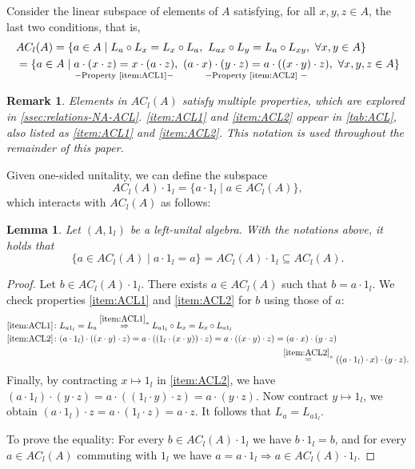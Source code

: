 \documentclass[12pt]{article}
\newtheorem{lemma}[theorem]{Lemma}
\newtheorem{remark}[theorem]{Remark}
\begin{document}
		Consider the linear subspace of elements of $A$ satisfying, for all $x,y,z\in A$, the last two conditions, that is,
		\begin{align*}
			&AC_l(A)=\{a\in A \mid L_a\circ L_x=L_x\circ L_a,\ L_{ax}\circ L_y=L_a\circ L_{xy},\ \forall x,y\in A\}\\
			&=\{a\in A \mid \underset{-\textnormal{Property \ref{item:ACL1}} -}{a\cdot (x\cdot z)=x\cdot (a\cdot z)},\ \underset{-\textnormal{Property \ref{item:ACL2} } -}{(a\cdot x)\cdot (y\cdot z)=a\cdot ((x\cdot y)\cdot z)},\ \forall x,y,z\in A\}
		\end{align*}
		\begin{remark}
			Elements in $AC_l(A)$ satisfy multiple properties, which are explored in \cref{ssec:relations-NA-ACL}. \textnormal{\ref{item:ACL1}} and \textnormal{\ref{item:ACL2}} appear in \cref{tab:ACL}, also listed as \textnormal{\ref{item:ACL1}} and \textnormal{\ref{item:ACL2}}. This notation is used throughout the remainder of this paper.
		\end{remark}
		Given one-sided unitality, we can define the subspace
		\begin{equation}\label{eqn:ACL1_definition}
			AC_l(A)\cdot 1_l=\{a\cdot 1_l\mid a\in AC_l(A)\},
		\end{equation}
		which interacts with $AC_l(A)$ as follows:
		\begin{lemma}\label{lem:ACLcommutes}
			Let $(A,1_l)$ be a left-unital algebra. With the notations above, it holds that
			\begin{equation*}
				\{a\in AC_l(A)\mid a\cdot 1_l=a\}=AC_l(A)\cdot 1_l\subseteq AC_l(A).
			\end{equation*}
		\end{lemma}
		
		\begin{proof}
			Let $b\in AC_l(A)\cdot 1_l$. There exists $a\in AC_l(A)$ such that $b=a\cdot 1_l$. We check properties \ref{item:ACL1} and \ref{item:ACL2} for $b$ using those of $a$:
			\begin{align*}
				\ref{item:ACL1}&\colon L_{a1_l}=L_a \overset{\ref{item:ACL1}_a}{\Rightarrow} L_{a1_l}\circ L_x=L_x\circ L_{a1_l}\\
				\ref{item:ACL2}&\colon (a\cdot 1_l)\cdot ((x\cdot y)\cdot z)=a\cdot ((1_l\cdot (x\cdot y))\cdot z)=a\cdot ((x\cdot y)\cdot z)=(a\cdot x)\cdot (y\cdot z)\\
				&\hspace{9.25cm}\overset{\ref{item:ACL2}_a}{=}((a\cdot 1_l)\cdot x)\cdot (y\cdot z).
			\end{align*}
			Finally, by contracting $x\mapsto 1_l$ in \ref{item:ACL2}, we have $(a\cdot 1_l)\cdot (y\cdot z)=a\cdot ((1_l\cdot y)\cdot z)=a\cdot (y\cdot z)$. Now contract $y\mapsto 1_l$, we obtain $(a\cdot 1_l)\cdot z=a\cdot (1_l\cdot z)=a\cdot z$. It follows that $L_a=L_{a1_l}$.
			
			To prove the equality: For every $b\in AC_l(A)\cdot 1_l$ we have $b\cdot 1_l=b$, and for every $a\in AC_l(A)$ commuting with $1_l$ we have $a=a\cdot 1_l\Rightarrow a\in AC_l(A)\cdot 1_l$.
		\end{proof}
		
\end{document}
